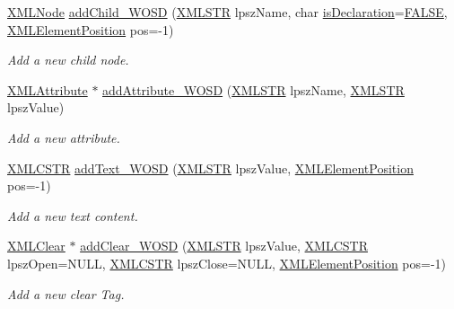 \begin{DoxyCompactItemize}
\hyperlink{structXMLNode}{X\-M\-L\-Node} \hyperlink{group__xmlWOSD_ga24b13602fdff0194b087df4eaf28e703}{add\-Child\-\_\-\-W\-O\-S\-D} (\hyperlink{xmlParser_8h_a849d96105aa0c8f64b5c10d9151a3cdc}{X\-M\-L\-S\-T\-R} lpsz\-Name, char \hyperlink{group__navigate_ga71df27d54a2dc09b0a456406a7e8c6d3}{is\-Declaration}=\hyperlink{xmlParser_8h_aa93f0eb578d23995850d61f7d61c55c1}{F\-A\-L\-S\-E}, \hyperlink{xmlParser_8h_aab10d65aadeca1f026f6416becde7432}{X\-M\-L\-Element\-Position} pos=-\/1)
\begin{DoxyCompactList}\small\item\em Add a new child node. \end{DoxyCompactList}\item 
\hyperlink{structXMLAttribute}{X\-M\-L\-Attribute} $\ast$ \hyperlink{group__xmlWOSD_ga653039c9f5fb22076a00b258284c65ee}{add\-Attribute\-\_\-\-W\-O\-S\-D} (\hyperlink{xmlParser_8h_a849d96105aa0c8f64b5c10d9151a3cdc}{X\-M\-L\-S\-T\-R} lpsz\-Name, \hyperlink{xmlParser_8h_a849d96105aa0c8f64b5c10d9151a3cdc}{X\-M\-L\-S\-T\-R} lpsz\-Value)
\begin{DoxyCompactList}\small\item\em Add a new attribute. \end{DoxyCompactList}\item 
\hyperlink{xmlParser_8h_acdb0d6fd8dd596384b438d86cfb2b182}{X\-M\-L\-C\-S\-T\-R} \hyperlink{group__xmlWOSD_ga90944eacfeb994486e3ca83a68c35b6a}{add\-Text\-\_\-\-W\-O\-S\-D} (\hyperlink{xmlParser_8h_a849d96105aa0c8f64b5c10d9151a3cdc}{X\-M\-L\-S\-T\-R} lpsz\-Value, \hyperlink{xmlParser_8h_aab10d65aadeca1f026f6416becde7432}{X\-M\-L\-Element\-Position} pos=-\/1)
\begin{DoxyCompactList}\small\item\em Add a new text content. \end{DoxyCompactList}\item 
\hyperlink{structXMLClear}{X\-M\-L\-Clear} $\ast$ \hyperlink{group__xmlWOSD_ga6d3ed8368db156df576e0c54f5f45d30}{add\-Clear\-\_\-\-W\-O\-S\-D} (\hyperlink{xmlParser_8h_a849d96105aa0c8f64b5c10d9151a3cdc}{X\-M\-L\-S\-T\-R} lpsz\-Value, \hyperlink{xmlParser_8h_acdb0d6fd8dd596384b438d86cfb2b182}{X\-M\-L\-C\-S\-T\-R} lpsz\-Open=N\-U\-L\-L, \hyperlink{xmlParser_8h_acdb0d6fd8dd596384b438d86cfb2b182}{X\-M\-L\-C\-S\-T\-R} lpsz\-Close=N\-U\-L\-L, \hyperlink{xmlParser_8h_aab10d65aadeca1f026f6416becde7432}{X\-M\-L\-Element\-Position} pos=-\/1)
\begin{DoxyCompactList}\small\item\em Add a new clear Tag. \end{DoxyCompactList}\item 

\end{DoxyCompactItemize}
